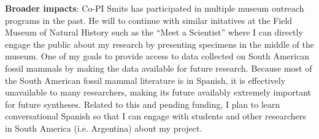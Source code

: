 \documentclass[11pt,letterpaper]{article}
\begin{document}
\textbf{Broader impacts}:
Co-PI Smits has participated in multiple museum outreach programs in the past. He will to continue with similar initatives at the Field Museum of Natural History such as the ``Meet a Scientist'' where I can directly engage the public about my research by presenting specimens in the middle of the museum. One of my goals to provide access to data collected on South American fossil mammals by making the data available for future research. Because most of the South American fossil mammal literature is in Spanish, it is effectively unavailable to many researchers, making its future availably extremely important for future syntheses. Related to this and pending funding, I plan to learn conversational Spanish so that I can engage with students and other researchers in South America (i.e. Argentina) about my project. 
\end{document}

